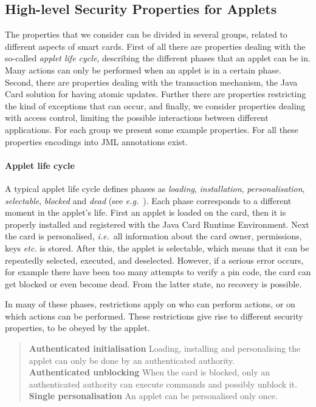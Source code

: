 \subsection{High-level Security Properties for Applets}
\label{SecHighLevelSecProp}

The properties that we consider can be divided in several groups,
related to different aspects of smart cards. First of all there are
properties dealing with the so-called \emph{applet life cycle},
describing the different phases that an applet can be in. Many actions
can only be performed when an applet is in a certain phase. Second,
there are properties dealing with the transaction mechanism, the Java
Card solution for having atomic updates. Further there are properties
restricting the kind of exceptions that can occur, and finally, we
consider properties dealing with access control, limiting the possible
interactions between different applications. For each group we present
some example properties. For all these properties encodings into JML
annotations exist.

\paragraph {Applet life cycle}

A typical applet life cycle defines phases as {\it loading},
{\it installation}, {\it personalisation}, {\it selectable},
{\it blocked} and {\it dead}
(see \emph{e.g.}~\/\cite{MarletLM01}).  Each phase corresponds to a
different moment in the applet's life. First an applet is loaded on
the card, then it is properly installed and registered with the Java
Card Runtime Environment. Next the card is personalised,
\emph{i.e.}~all information about the card owner, permissions, keys
\emph{etc.} is stored. After this, the applet is selectable, which means
that it can be repeatedly selected, executed, and deselected. However,
if a serious error occurs, for example there
have been too many attempts to verify a pin code, the card can get
blocked or even become dead. From the latter state, no recovery is
possible.

In many of these phases, restrictions apply on who can perform
actions, or on which actions can be performed. These restrictions give
rise to different security properties, to be obeyed by the applet.

\begin{quote}
\textbf{Authenticated initialisation} Loading, installing and 
personalising the applet can only be done by an authenticated
authority.\smallskip\\
\textbf{Authenticated unblocking} When the card is blocked,
only an authenticated authority can execute commands and possibly
unblock it.\smallskip\\
\textbf{Single personalisation} An applet can be
personalised only once.
\end{quote}


